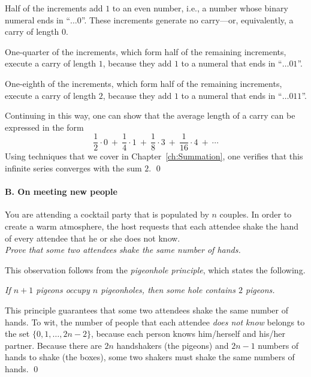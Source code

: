 \medskip


\noindent
Half of the increments add $1$ to an even number, i.e., a number whose
binary numeral ends in ``$ \ldots 0$''.  These increments generate no
carry---or, equivalently, a carry of length $0$.

\noindent
One-quarter of the increments, which form half of the remaining
increments, execute a carry of length $1$, because they add $1$ to a
numeral that ends in ``$ \ldots 01$''.

\noindent
One-eighth of the increments, which form half of the remaining
increments, execute a carry of length $2$, because they add $1$ to a
numeral that ends in ``$ \ldots 011$''.

Continuing in this way, one can show that the average length of a
carry can be expressed in the form
\[ 
\frac{1}{2} \cdot 0 \ + \ \frac{1}{4} \cdot 1 \ + \ \frac{1}{8} \cdot
3 \ + \ \frac{1}{16} \cdot 4 \ + \ \cdots
\]
Using techniques that we cover in Chapter~\ref{ch:Summation}, one
verifies that this infinite series converges with the sum $2$.  \qed


\paragraph{\small\sf B. On meeting new people}

%
You are attending a cocktail party that is populated by $n$ couples.
In order to create a warm atmosphere, the host requests that each
attendee shake the hand of every attendee that he or she does not
know.  \\
{\em Prove that some two attendees shake the same number of hands.}

\medskip

%
This observation follows from the {\it pigeonhole principle}, which
states the following.

{\it If $n+1$ pigeons occupy $n$ pigeonholes, then some hole contains
  $2$ pigeons.}

\noindent
This principle guarantees that some two attendees shake the same
number of hands.  To wit, the number of people that each attendee {\em
  does not know} belongs to the set $\{ 0, 1, \ldots, 2n-2 \}$,
because each person knows him/herself and his/her partner.  Because
there are $2n$ handshakers (the pigeons) and $2n-1$ numbers of hands
to shake (the boxes), some two shakers must shake the same numbers of
hands.  \qed


